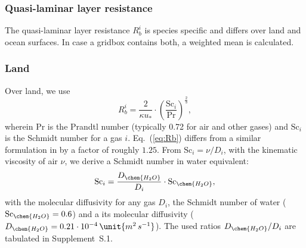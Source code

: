 \documentclass[gmd, manuscript]{copernicus}
\begin{document}
\subsubsection{Quasi-laminar layer resistance}
\label{subsubsec:Rb}
The quasi-laminar layer resistance $R_b^i$ is species specific and differs over land and ocean surfaces. In case a gridbox contains both, a weighted mean is calculated.
\subsubsection*{Land}
Over land, we use \citep[Eq.~(53),][]{ACP:Simpson2012}
\begin{equation}
  R_b^i = \frac{2}{\kappa u_*} \cdot \left(\frac{\text{Sc}_i}{\text{Pr}}\right)^{\frac{2}{3}},
  \label{eq:Rb}
\end{equation}
wherein $\text{Pr}$ is the Prandtl number (typically 0.72 for air and other gases) and $\text{Sc}_i$ is the Schmidt number for a gas $i$. Eq.~(\ref{eq:Rb}) differs from a similar formulation in \citet{ACP:Seinfeld2006} by a factor of roughly $1.25$. From $\text{Sc}_i = \nu/D_i$, with the kinematic viscosity of air $\nu$, we derive a Schmidt number in water equivalent:
\begin{equation}
  \text{Sc}_i = \frac{D_\chem{H_2O}}{D_i} \cdot \text{Sc}_\chem{H_2O},
\end{equation}
with the molecular diffusivity for any gas $D_i$, the Schmidt number of water ($\text{Sc}_\chem{H_2O}=0.6$) and a its molecular diffusivity ($D_\chem{H_2O}=0.21\cdot10^{-4}\,\unit{m^2\,s^{-1}}$). The used ratios $D_\chem{H_2O}/D_i$ are tabulated in Supplement~S.1.
%

\end{document}
